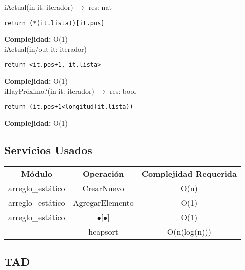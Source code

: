 iActual(in it: iterador) $\rightarrow$ res: nat
\begin{lstlisting}[mathescape]
 return (*(it.lista))[it.pos]
\end{lstlisting}
\textbf{Complejidad:} O(1)\\

iActual(in/out it: iterador)
\begin{lstlisting}[mathescape]
 return <it.pos+1, it.lista>
\end{lstlisting}
\textbf{Complejidad:} O(1)\\

iHayPr\'oximo?(in it: iterador) $\rightarrow$ res: bool
\begin{lstlisting}[mathescape]
 return (it.pos+1<longitud(it.lista))
\end{lstlisting}
\textbf{Complejidad:} O(1)\\



\subsection{Servicios Usados}
\begin{center}
\begin{tabular*}{2.75\textwidth}{c |c | c }
\textbf{M\'odulo} & \textbf{Operaci\'on} & \textbf{Complejidad Requerida}\\
arreglo\_est\'atico & CrearNuevo & O(n)\\
arreglo\_est\'atico & AgregarElemento & O(1)\\
arreglo\_est\'atico & $\bullet$[$\bullet$] & O(1)\\
& heapsort & O(n(log(n)))\\
\end{tabular*}
\end{center}


\subsection {TAD }

\begin{tad}{}



\tadObservadores
{}

\tadGeneradores
{}

\tadOtrasOperaciones
{}




\end{tad}
